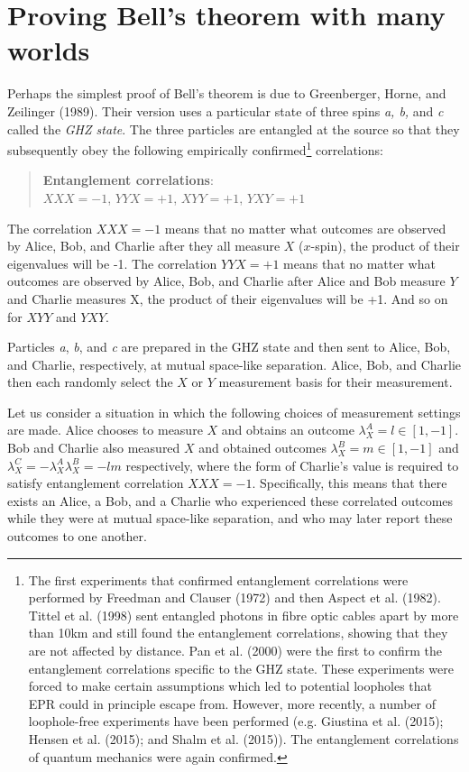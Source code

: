 \documentclass[12pt]{article}
\begin{document}
\section{Proving Bell's theorem with many worlds} \label{BellMany}

Perhaps the simplest proof of Bell's theorem is due to Greenberger, Horne, and Zeilinger (1989). Their version uses a particular state of three spins \textit{a, b,} and \textit{c} called the \textit{GHZ state}. The three particles are entangled at the source so that they subsequently obey the following empirically confirmed\footnote{The first experiments that confirmed entanglement correlations were performed by Freedman and Clauser (1972) and then Aspect et al. (1982). Tittel et al. (1998) sent entangled photons in fibre optic cables apart by more than 10km and still found the entanglement correlations, showing that they are not affected by distance. Pan et al. (2000) were the first to confirm the entanglement correlations specific to the GHZ state. These experiments were forced to make certain assumptions which led to potential loopholes that EPR could in principle escape from. However, more recently, a number of loophole-free experiments have been performed (e.g. Giustina et al. (2015); Hensen et al. (2015); and Shalm et al. (2015)). The entanglement correlations of quantum mechanics were again confirmed.} correlations:

\begin{quote}
\textbf{Entanglement correlations}:\\ $XXX=-1$, $YYX = +1$, $XYY = +1$, $YXY = +1$ 
\end{quote}

The correlation $XXX=-1$ means that no matter what outcomes are observed by Alice, Bob, and Charlie after they all measure $X$ ($x$-spin), the product of their eigenvalues will be -1. The correlation $YYX=+1$ means that no matter what outcomes are observed by Alice, Bob, and Charlie after Alice and Bob measure $Y$ and Charlie measures X, the product of their eigenvalues will be +1. And so on for $XYY$ and $YXY$.

Particles \textit{a}, \textit{b}, and \textit{c} are prepared in the GHZ state and then sent to Alice, Bob, and Charlie, respectively, at mutual space-like separation. Alice, Bob, and Charlie then each randomly select the $X$ or $Y$ measurement basis for their measurement.

Let us consider a situation in which the following choices of measurement settings are made. Alice chooses to measure $X$ and obtains an outcome $\lambda_X^A = l \in [1,-1]$. Bob and Charlie also measured $X$ and obtained outcomes $\lambda_X^B = m \in [1,-1]$ and $\lambda_X^C = -\lambda_X^A \lambda_X^B = -lm$ respectively, where the form of Charlie's value is required to satisfy entanglement correlation $XXX=-1$.  Specifically, this means that there exists an Alice, a Bob, and a Charlie who experienced these correlated outcomes while they were at mutual space-like separation, and who may later report these outcomes to one another.
\end{document}
